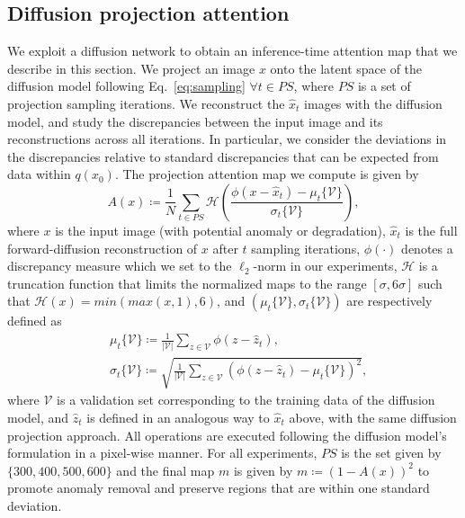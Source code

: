 \documentclass{article}
\begin{document}
\subsection{Diffusion projection attention} \label{sec:projection}
We exploit a diffusion network to obtain an inference-time attention map that we describe in this section. We project an image $x$ onto the latent space of the diffusion model following Eq.~\eqref{eq:sampling} $\forall t \in PS$, where $PS$ is a set of projection sampling iterations. We reconstruct the $\widehat{x}_t$ images with the diffusion model, and study the discrepancies between the input image and its reconstructions across all iterations. In particular, we consider the deviations in the discrepancies relative to standard discrepancies that can be expected from data within $q(x_0)$. The projection attention map we compute is given by
\begin{equation} \label{eq:map}
    A(x) \coloneqq \frac{1}{N}\sum_{t \in PS} \mathcal{H}\left( \frac{
    \phi(x-\widehat{x}_t ) -  \mu_t\{\mathcal{V}\}
    }{
    \sigma_t\{\mathcal{V}\}
    } \right),
\end{equation}
where $x$ is the input image (with potential anomaly or degradation), $\widehat{x}_t$ is the full forward-diffusion reconstruction of $x$ after $t$ sampling iterations, $\phi(\cdot)$ denotes a discrepancy measure which we set to the $\ell_2$-norm in our experiments, $\mathcal{H}$ is a truncation function that limits the normalized maps to the range $[\sigma, 6\sigma]$ such that $\mathcal{H}(x)=min(max(x,1),6)$, and $(\mu_t\{\mathcal{V}\}, \sigma_t\{\mathcal{V}\})$ are respectively defined as
\begin{equation}
    \begin{split}
    & \mu_t\{\mathcal{V}\} \coloneqq \frac{1}{|\mathcal{V}|} \sum_{z\in \mathcal{V}} \phi(z - \widehat{z}_t) , \\
    & \sigma_t\{\mathcal{V}\} \coloneqq \sqrt{
    \frac{1}{|\mathcal{V}|}\sum_{z\in \mathcal{V}}{
    ( \phi(z - \widehat{z}_t) - \mu_t\{\mathcal{V}\})^2}},
    \end{split}
\end{equation}
where $\mathcal{V}$ is a validation set corresponding to the training data of the diffusion model, and $\widehat{z}_t$ is defined in an analogous way to $\widehat{x}_t$ above, with the same diffusion projection approach. All operations are executed following the diffusion model's formulation in a pixel-wise manner.
For all experiments, $PS$ is the set given by $\{300,400,500,600\}$ and the final map $m$ is given by $m\coloneqq (1-A(x))^2$ to promote anomaly removal and preserve regions that are within one standard deviation.
\end{document}
